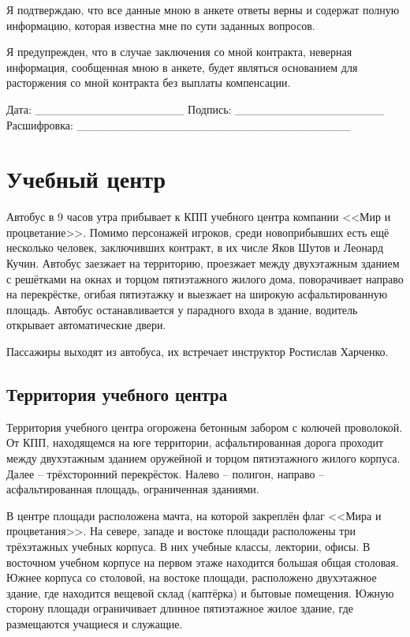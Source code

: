 \documentclass{article}
\begin{document}
Я подтверждаю, что все данные мною в анкете ответы верны и содержат
полную информацию, которая известна мне по сути заданных вопросов.

Я предупрежден, что в случае заключения со мной контракта, неверная
информация, сообщенная мною в анкете, будет являться основанием для
расторжения со мной контракта без выплаты компенсации.

Дата: \_\_\_\_\_\_\_\_\_\_\_\_\_\_\_\_\_\_ Подпись:
\_\_\_\_\_\_\_\_\_\_\_\_\_\_\_\_\_\_ Расшифровка:
\_\_\_\_\_\_\_\_\_\_\_\_\_\_\_\_\_\_\_\_\_\_\_\_\_\_\_\_\_\_\_\_\_

\section{Учебный
центр}\label{training-center}

Автобус в 9 часов утра прибывает к КПП учебного центра компании <<Мир и
процветание>>. Помимо персонажей игроков, среди новоприбывших есть ещё
несколько человек, заключивших контракт, в их числе Яков Шутов и Леонард
Кучин. Автобус заезжает на территорию, проезжает между двухэтажным
зданием с решётками на окнах и торцом пятиэтажного жилого дома,
поворачивает направо на перекрёстке, огибая пятиэтажку и выезжает на
широкую асфальтированную площадь. Автобус останавливается у парадного
входа в здание, водитель открывает автоматические двери.

Пассажиры выходят из автобуса, их встречает инструктор Ростислав
Харченко.

\subsection{Территория учебного
центра}\label{training-grounds}

Территория учебного центра огорожена бетонным забором с колючей
проволокой. От КПП, находящемся на юге территории, асфальтированная
дорога проходит между двухэтажным зданием оружейной и торцом
пятиэтажного жилого корпуса. Далее -- трёхсторонний перекрёсток. Налево
-- полигон, направо -- асфальтированная площадь, ограниченная зданиями.

В центре площади расположена мачта, на которой закреплён флаг <<Мира и
процветания>>. На севере, западе и востоке площади расположены три
трёхэтажных учебных корпуса. В них учебные классы, лектории, офисы. В
восточном учебном корпусе на первом этаже находится большая общая
столовая. Южнее корпуса со столовой, на востоке площади, расположено
двухэтажное здание, где находится вещевой склад (каптёрка) и бытовые
помещения. Южную сторону площади ограничивает длинное пятиэтажное жилое
здание, где размещаются учащиеся и служащие.
\end{document}
